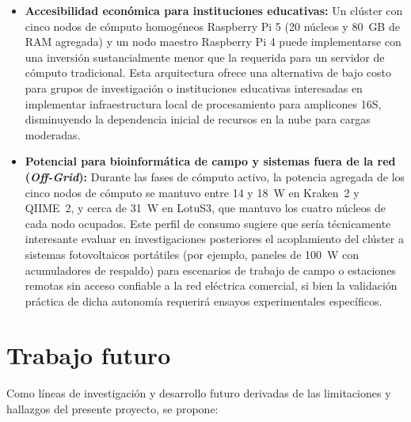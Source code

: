 \documentclass[12pt,oneside,spanish]{book}
\begin{document}
    \begin{itemize}
        \item \textbf{Accesibilidad económica para instituciones educativas:} Un clúster con cinco nodos de cómputo homogéneos Raspberry Pi 5 (20 núcleos y 80~GB de RAM agregada) y un nodo maestro Raspberry Pi 4 puede implementarse con una inversión sustancialmente menor que la requerida para un servidor de cómputo tradicional. Esta arquitectura ofrece una alternativa de bajo costo para grupos de investigación o instituciones educativas interesadas en implementar infraestructura local de procesamiento para amplicones 16S, disminuyendo la dependencia inicial de recursos en la nube para cargas moderadas.
        
        \item \textbf{Potencial para bioinformática de campo y sistemas fuera de la red (\textit{Off-Grid}):} Durante las fases de cómputo activo, la potencia agregada de los cinco nodos de cómputo se mantuvo entre 14 y 18~W en Kraken~2 y QIIME~2, y cerca de 31~W en LotuS3, que mantuvo los cuatro núcleos de cada nodo ocupados. Este perfil de consumo sugiere que sería técnicamente interesante evaluar en investigaciones posteriores el acoplamiento del clúster a sistemas fotovoltaicos portátiles (por ejemplo, paneles de 100~W con acumuladores de respaldo) para escenarios de trabajo de campo o estaciones remotas sin acceso confiable a la red eléctrica comercial, si bien la validación práctica de dicha autonomía requerirá ensayos experimentales específicos.
    \end{itemize}
    
    \section{Trabajo futuro}
    Como líneas de investigación y desarrollo futuro derivadas de las limitaciones y hallazgos del presente proyecto, se propone:
\newpage
\end{document}
